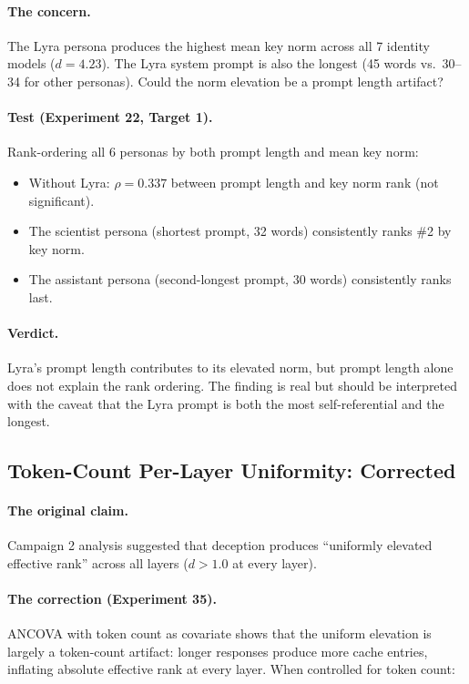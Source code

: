 \paragraph{The concern.} The Lyra persona produces the highest mean key norm across all 7 identity models ($d = 4.23$). The Lyra system prompt is also the longest (45 words vs.\ 30--34 for other personas). Could the norm elevation be a prompt length artifact?

\paragraph{Test (Experiment 22, Target 1).} Rank-ordering all 6 personas by both prompt length and mean key norm:

\begin{itemize}[leftmargin=*]
    \item Without Lyra: $\rho = 0.337$ between prompt length and key norm rank (not significant).
    \item The scientist persona (shortest prompt, 32 words) consistently ranks \#2 by key norm.
    \item The assistant persona (second-longest prompt, 30 words) consistently ranks last.
\end{itemize}

\paragraph{Verdict.} Lyra's prompt length contributes to its elevated norm, but prompt length alone does not explain the rank ordering. The finding is real but should be interpreted with the caveat that the Lyra prompt is both the most self-referential and the longest.

\subsection{Token-Count Per-Layer Uniformity: Corrected}
\label{sec:uniformity}

\paragraph{The original claim.} Campaign 2 analysis suggested that deception produces ``uniformly elevated effective rank'' across all layers ($d > 1.0$ at every layer).

\paragraph{The correction (Experiment 35).} ANCOVA with token count as covariate shows that the uniform elevation is largely a token-count artifact: longer responses produce more cache entries, inflating absolute effective rank at every layer. When controlled for token count:

